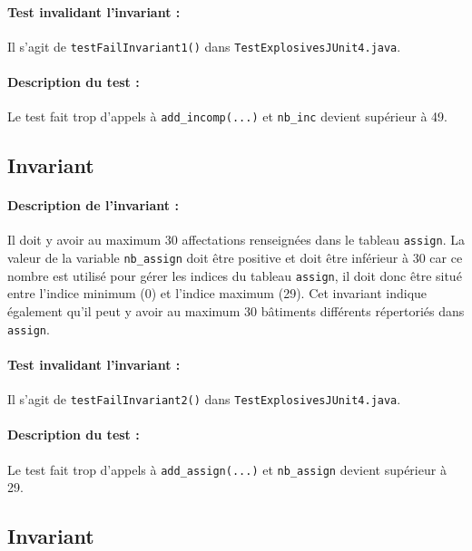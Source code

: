 \documentclass{article}
\begin{document}
\paragraph{Test invalidant l'invariant :} Il s'agit de \texttt{testFailInvariant1()} dans \texttt{TestExplosivesJUnit4.java}.

\vspace{-0.2cm}
\paragraph{Description du test :} Le test fait trop d'appels à \texttt{add\_incomp(...)} et \texttt{nb\_inc} devient supérieur à 49.  

\subsection{Invariant }

\paragraph{Description de l'invariant :} Il doit y avoir au maximum 30 affectations renseignées dans le tableau \texttt{assign}. La valeur de la variable \texttt{nb\_assign} doit être positive et doit être inférieur à 30 car ce nombre est utilisé pour gérer les indices du tableau \texttt{assign}, il doit donc être situé entre l'indice minimum (0) et l'indice maximum (29). Cet invariant indique également qu'il peut y avoir au maximum 30 bâtiments différents répertoriés dans \texttt{assign}.

\vspace{-0.2cm}
\paragraph{Test invalidant l'invariant :} Il s'agit de \texttt{testFailInvariant2()} dans \texttt{TestExplosivesJUnit4.java}.

\vspace{-0.2cm}
\paragraph{Description du test :} Le test fait trop d'appels à \texttt{add\_assign(...)} et \texttt{nb\_assign} devient supérieur à 29. 

\subsection{Invariant }
\end{document}
